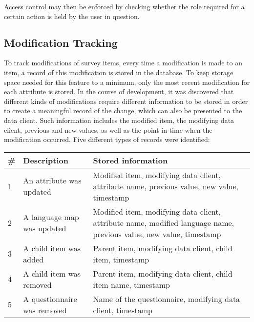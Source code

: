     Access control may then be enforced by checking whether the role required
    for a certain action is held by the user in question.

\subsection{Modification Tracking}
\label{section:modification-tracking}
    To track modifications of survey items, every time a modification
    is made to an item, a record of this modification is stored in the
    database. To keep storage space needed for this feature to a minimum,
    only the most recent modification for each attribute is stored.
    In the course of development, it was discovered that different kinds of modifications
    require different information to be stored in order to create a meaningful
    record of the change, which can also be presented to the data client.
    Such information includes the modified item, the modifying data client,
    previous and new values, as well as the point in time when the modification
    occurred. Five different types of records were identified:

    \begin{table}[H]
        \begin{tabularx}{\textwidth}{|l|l|X|}
            \hline
            \# & Description & Stored information \\
            \hline \hline
            1 & An attribute was updated  & Modified item, modifying data client, attribute name, previous value, new value, timestamp \\
            2 & A language map was updated & Modified item, modifying data client, attribute name, modified language name, previous value, new value, timestamp \\
            \hline
            3 & A child item was added & Parent item, modifying data client, child item, timestamp \\
            4 & A child item was removed & Parent item, modifying data client, child item name, timestamp \\
            \hline
            5 & A questionnaire was removed & Name of the questionnaire, modifying data client, timestamp\\
            \hline
        \end{tabularx}
    \end{table}

